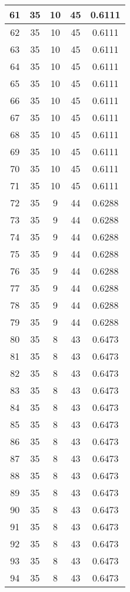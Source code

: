 \documentclass[letterpaper, 12pt]{article}
\begin{document}
\begin{longtable}{|c|c|c|c|c|}
\hline
61 & 35 & 10 & 45 & 0.6111 \\
\hline
62 & 35 & 10 & 45 & 0.6111 \\
\hline
63 & 35 & 10 & 45 & 0.6111 \\
\hline
64 & 35 & 10 & 45 & 0.6111 \\
\hline
65 & 35 & 10 & 45 & 0.6111 \\
\hline
66 & 35 & 10 & 45 & 0.6111 \\
\hline
67 & 35 & 10 & 45 & 0.6111 \\
\hline
68 & 35 & 10 & 45 & 0.6111 \\
\hline
69 & 35 & 10 & 45 & 0.6111 \\
\hline
70 & 35 & 10 & 45 & 0.6111 \\
\hline
71 & 35 & 10 & 45 & 0.6111 \\
\hline
72 & 35 & 9 & 44 & 0.6288 \\
\hline
73 & 35 & 9 & 44 & 0.6288 \\
\hline
74 & 35 & 9 & 44 & 0.6288 \\
\hline
75 & 35 & 9 & 44 & 0.6288 \\
\hline
76 & 35 & 9 & 44 & 0.6288 \\
\hline
77 & 35 & 9 & 44 & 0.6288 \\
\hline
78 & 35 & 9 & 44 & 0.6288 \\
\hline
79 & 35 & 9 & 44 & 0.6288 \\
\hline
80 & 35 & 8 & 43 & 0.6473 \\
\hline
81 & 35 & 8 & 43 & 0.6473 \\
\hline
82 & 35 & 8 & 43 & 0.6473 \\
\hline
83 & 35 & 8 & 43 & 0.6473 \\
\hline
84 & 35 & 8 & 43 & 0.6473 \\
\hline
85 & 35 & 8 & 43 & 0.6473 \\
\hline
86 & 35 & 8 & 43 & 0.6473 \\
\hline
87 & 35 & 8 & 43 & 0.6473 \\
\hline
88 & 35 & 8 & 43 & 0.6473 \\
\hline
89 & 35 & 8 & 43 & 0.6473 \\
\hline
90 & 35 & 8 & 43 & 0.6473 \\
\hline
91 & 35 & 8 & 43 & 0.6473 \\
\hline
92 & 35 & 8 & 43 & 0.6473 \\
\hline
93 & 35 & 8 & 43 & 0.6473 \\
\hline
94 & 35 & 8 & 43 & 0.6473 \\
\hline

\end{longtable}
\end{document}
